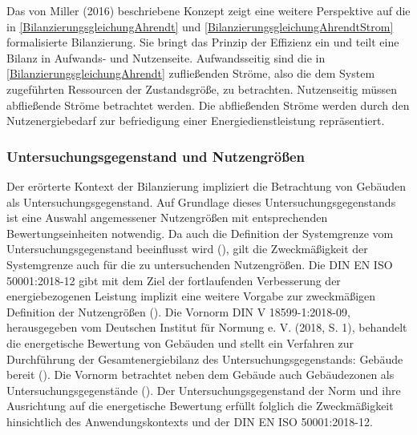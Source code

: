 Das von Miller (2016) beschriebene Konzept zeigt eine weitere Perspektive auf die in \eqref{BilanzierungsgleichungAhrendt} und \eqref{BilanzierungsgleichungAhrendtStrom} 
formalisierte Bilanzierung. Sie bringt das Prinzip der Effizienz ein und teilt eine Bilanz in Aufwands- und Nutzenseite.
Aufwandsseitig sind die in \eqref{BilanzierungsgleichungAhrendt} zufließenden Ströme, also die dem System zugeführten Ressourcen der Zustandsgröße, zu betrachten.
Nutzenseitig müssen abfließende Ströme betrachtet werden. Die abfließenden Ströme werden durch den Nutzenergiebedarf zur befriedigung einer Energiedienstleistung 
repräsentiert. 


\subsubsection{Untersuchungsgegenstand und Nutzengrößen}

Der erörterte Kontext der Bilanzierung impliziert die Betrachtung von Gebäuden als Untersuchungsgegenstand.
Auf Grundlage dieses Untersuchungsgegenstands ist eine Auswahl angemessener Nutzengrößen mit entsprechenden Bewertungseinheiten notwendig.
Da auch die Definition der Systemgrenze vom Untersuchungsgegenstand beeinflusst wird (\cite[S. 109]{Miller.2016}), gilt die Zweckmäßigkeit der Systemgrenze auch für die 
zu untersuchenden Nutzengrößen.
Die DIN EN ISO 50001:2018-12 gibt mit dem Ziel der fortlaufenden Verbesserung der energiebezogenen Leistung implizit eine weitere Vorgabe zur zweckmäßigen Definition 
der Nutzengrößen (\cite[S. 11]{DIN50001.2018}).
Die Vornorm DIN V 18599-1:2018-09, herausgegeben vom Deutschen Institut für Normung e. V. (2018, S. 1), behandelt die energetische Bewertung von Gebäuden und stellt ein 
Verfahren zur Durchführung der Gesamtenergiebilanz des Untersuchungsgegenstands: Gebäude bereit (\cite[S. 9]{DIN18599.2018}). 
Die Vornorm betrachtet neben dem Gebäude auch Gebäudezonen als Untersuchungsgegenstände (\cite{DIN18599.2018}).
Der Untersuchungsgegenstand der Norm und ihre Ausrichtung auf die energetische Bewertung erfüllt folglich die Zweckmäßigkeit hinsichtlich des Anwendungskontexts und der 
DIN EN ISO 50001:2018-12. 

